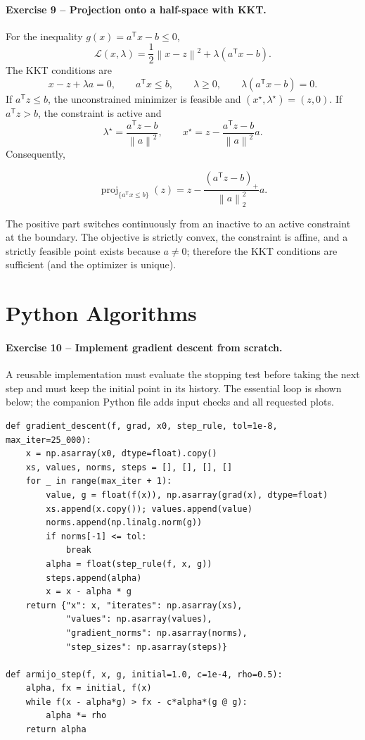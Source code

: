 \documentclass[10pt]{article}
\newcommand{\trans}{^{\mathsf T}}
\newcommand{\norm}[1]{\left\lVert#1\right\rVert}
\newcommand{\proj}{\operatorname{proj}}
\newcommand{\pospart}[1]{\left(#1\right)_{+}}
\begin{document}
\paragraph{Exercise 9 -- Projection onto a half-space with KKT.}

For the inequality \(g(x)=a\trans x-b\leq0\),
\[
\mathcal L(x,\lambda)
=\frac12\norm{x-z}^2+\lambda(a\trans x-b).
\]
The KKT conditions are
\[
x-z+\lambda a=0,
\qquad a\trans x\leq b,
\qquad \lambda\geq0,
\qquad \lambda(a\trans x-b)=0.
\]
If \(a\trans z\leq b\), the unconstrained minimizer is feasible and
\((x^\star,\lambda^\star)=(z,0)\). If \(a\trans z>b\), the constraint is active
and
\[
\lambda^\star=\frac{a\trans z-b}{\norm a^2},
\qquad
x^\star=z-\frac{a\trans z-b}{\norm a^2}a.
\]
Consequently,
\begin{resultbox}
\[
\proj_{\{a\trans x\leq b\}}(z)
=z-\frac{\pospart{a\trans z-b}}{\norm a_2^2}a.
\]
\end{resultbox}
The positive part switches continuously from an inactive to an active
constraint at the boundary. The objective is strictly convex, the constraint
is affine, and a strictly feasible point exists because \(a\ne0\); therefore
the KKT conditions are sufficient (and the optimizer is unique).

\section{Python Algorithms}

\paragraph{Exercise 10 -- Implement gradient descent from scratch.}

A reusable implementation must evaluate the stopping test before taking the
next step and must keep the initial point in its history. The essential loop is
shown below; the companion Python file adds input checks and all requested
plots.

\begin{lstlisting}[style=python]
def gradient_descent(f, grad, x0, step_rule, tol=1e-8, max_iter=25_000):
    x = np.asarray(x0, dtype=float).copy()
    xs, values, norms, steps = [], [], [], []
    for _ in range(max_iter + 1):
        value, g = float(f(x)), np.asarray(grad(x), dtype=float)
        xs.append(x.copy()); values.append(value)
        norms.append(np.linalg.norm(g))
        if norms[-1] <= tol:
            break
        alpha = float(step_rule(f, x, g))
        steps.append(alpha)
        x = x - alpha * g
    return {"x": x, "iterates": np.asarray(xs),
            "values": np.asarray(values),
            "gradient_norms": np.asarray(norms),
            "step_sizes": np.asarray(steps)}

def armijo_step(f, x, g, initial=1.0, c=1e-4, rho=0.5):
    alpha, fx = initial, f(x)
    while f(x - alpha*g) > fx - c*alpha*(g @ g):
        alpha *= rho
    return alpha
\end{lstlisting}
\end{document}
